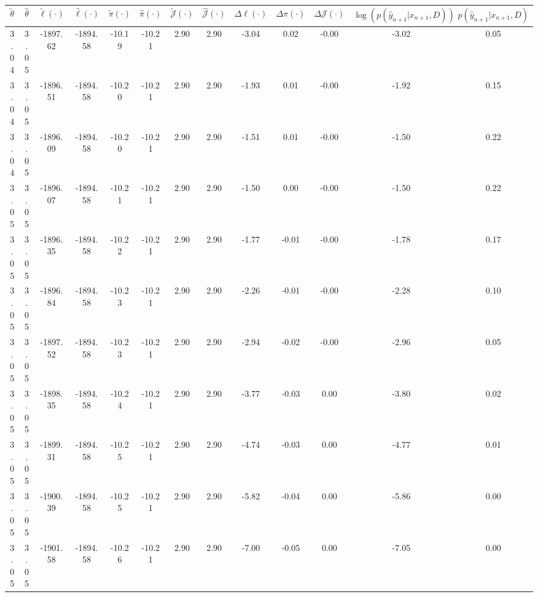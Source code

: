 \begin{table}[htbp]
        \centering
        \tiny
        \begin{adjustbox}{angle=90}
            \begin{tabular}{|c|c|c|c|c|c|c|c|c|c|c|c|c|}
                \hline
                 $\tilde{\theta}$ & $\hat{\theta}$ & $\tilde{\ell}(\cdot)$ & $\hat{\ell}(\cdot)$ & $\tilde{\pi}(\cdot)$ & $\hat{\pi}(\cdot)$ & $\tilde{\mathcal{J}}(\cdot)$ & $\hat{\mathcal{J}}(\cdot)$ & $\Delta \ell(\cdot)$ & $\Delta \pi(\cdot)$ & $\Delta \mathcal{J}(\cdot)$ & $\log(p(\hat{y}_{n+1}|x_{n+1}, D))$ & $p(\hat{y}_{n+1}|x_{n+1}, D)$ \\
                \hline
                 3.04 & 3.05 & -1897.62 & -1894.58 & -10.19 & -10.21 & 2.90 & 2.90 & -3.04 & 0.02 & -0.00 & -3.02 & 0.05\\ \hline
 3.04 & 3.05 & -1896.51 & -1894.58 & -10.20 & -10.21 & 2.90 & 2.90 & -1.93 & 0.01 & -0.00 & -1.92 & 0.15\\ \hline
 3.04 & 3.05 & -1896.09 & -1894.58 & -10.20 & -10.21 & 2.90 & 2.90 & -1.51 & 0.01 & -0.00 & -1.50 & 0.22\\ \hline
 3.05 & 3.05 & -1896.07 & -1894.58 & -10.21 & -10.21 & 2.90 & 2.90 & -1.50 & 0.00 & -0.00 & -1.50 & 0.22\\ \hline
 3.05 & 3.05 & -1896.35 & -1894.58 & -10.22 & -10.21 & 2.90 & 2.90 & -1.77 & -0.01 & -0.00 & -1.78 & 0.17\\ \hline
 3.05 & 3.05 & -1896.84 & -1894.58 & -10.23 & -10.21 & 2.90 & 2.90 & -2.26 & -0.01 & -0.00 & -2.28 & 0.10\\ \hline
 3.05 & 3.05 & -1897.52 & -1894.58 & -10.23 & -10.21 & 2.90 & 2.90 & -2.94 & -0.02 & -0.00 & -2.96 & 0.05\\ \hline
 3.05 & 3.05 & -1898.35 & -1894.58 & -10.24 & -10.21 & 2.90 & 2.90 & -3.77 & -0.03 & 0.00 & -3.80 & 0.02\\ \hline
 3.05 & 3.05 & -1899.31 & -1894.58 & -10.25 & -10.21 & 2.90 & 2.90 & -4.74 & -0.03 & 0.00 & -4.77 & 0.01\\ \hline
 3.05 & 3.05 & -1900.39 & -1894.58 & -10.25 & -10.21 & 2.90 & 2.90 & -5.82 & -0.04 & 0.00 & -5.86 & 0.00\\ \hline
 3.05 & 3.05 & -1901.58 & -1894.58 & -10.26 & -10.21 & 2.90 & 2.90 & -7.00 & -0.05 & 0.00 & -7.05 & 0.00\\ \hline
            \end{tabular}
        \end{adjustbox}
        \caption{}
        \label{}
    \end{table}
    